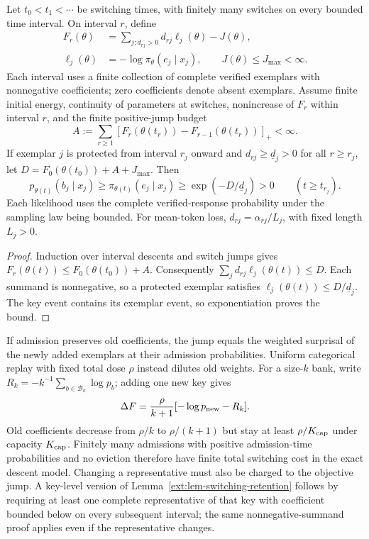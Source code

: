 \begin{lemma}
\label{ext:lem-switching-retention}
Let $t_0<t_1<\cdots$ be switching times, with finitely many switches on every
bounded time interval. On interval $r$, define
\[
 \begin{aligned}
 F_r(\theta)&=\sum_{j:d_{rj}>0}d_{rj}\ell_j(\theta)-J(\theta),\\
 \ell_j(\theta)&=-\log\pi_\theta(e_j\mid x_j),\qquad
 J(\theta)\le J_{\max}<\infty.
 \end{aligned}
\]
Each interval uses a finite collection of complete verified exemplars with
nonnegative coefficients; zero coefficients denote absent exemplars.
Assume finite initial energy, continuity of parameters at switches,
nonincrease of $F_r$ within interval $r$, and the finite positive-jump budget
\begin{equation}
 A:=\sum_{r\ge1}
   [F_r(\theta(t_r))-F_{r-1}(\theta(t_r))]_+<\infty.
 \label{ext:eq-switching-budget}
\end{equation}
If exemplar $j$ is protected from interval $r_j$ onward and
$d_{rj}\ge\underline d_j>0$ for all $r\ge r_j$, let
$D=F_0(\theta(t_0))+A+J_{\max}$. Then
\begin{equation}
 p_{\theta(t)}(b_j\mid x_j)\ge\pi_{\theta(t)}(e_j\mid x_j)
 \ge\exp(-D/\underline d_j)>0\qquad(t\ge t_{r_j}).
 \label{ext:eq-switching-retention}
\end{equation}
Each likelihood uses the complete verified-response probability under the
sampling law being bounded. For mean-token loss, $d_{rj}=\alpha_{rj}/L_j$,
with fixed length $L_j>0$.
\end{lemma}
\begin{proof}
Induction over interval descents and switch jumps gives
$F_r(\theta(t))\le F_0(\theta(t_0))+A$. Consequently
$\sum_jd_{rj}\ell_j(\theta(t))\le D$. Each summand is nonnegative, so a
protected exemplar satisfies $\ell_j(\theta(t))\le D/\underline d_j$.
The key event contains its exemplar event, so exponentiation proves
the bound.
\end{proof}

If admission preserves old coefficients, the jump equals the weighted
surprisal of the newly added exemplars at their admission probabilities.
Uniform categorical replay with fixed total dose $\rho$ instead dilutes old
weights. For a size-$k$ bank, write
$R_k=-k^{-1}\sum_{b\in\mathcal B_k}\log p_b$; adding one new key gives
\[
 \Delta F=\frac{\rho}{k+1}[-\log p_{\rm new}-R_k].
\]
Old coefficients decrease from $\rho/k$ to $\rho/(k+1)$ but stay at least
$\rho/K_{\rm cap}$ under capacity $K_{\rm cap}$. Finitely many admissions with positive
admission-time probabilities and no eviction therefore have finite total
switching cost in the exact descent model. Changing a representative must
also be charged to the objective jump. A key-level version of
Lemma~\ref{ext:lem-switching-retention} follows by requiring at least one
complete representative of that key with coefficient bounded below on every
subsequent interval; the same nonnegative-summand proof applies even if the
representative changes.

